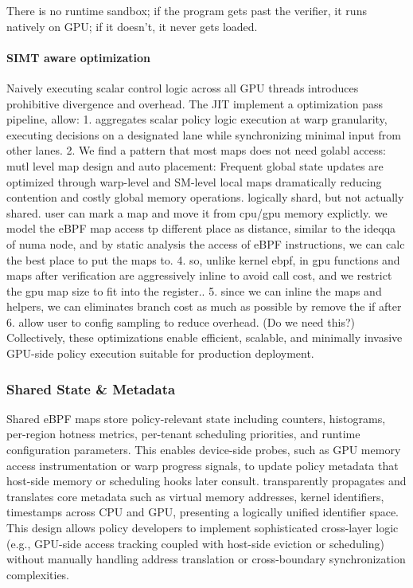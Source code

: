 There is no runtime sandbox; if the program gets past the verifier, it runs natively on GPU; if it doesn't, it never gets loaded.

\paragraph{SIMT aware optimization}

Naively executing scalar control logic across all GPU threads introduces prohibitive divergence and overhead. The \sys JIT implement a optimization pass pipeline, allow:
1. \sys aggregates scalar policy logic execution at warp granularity, executing decisions on a designated lane while synchronizing minimal input from other lanes.
2. We find a pattern that most maps does not need golabl access: mutl level map design and auto placement: Frequent global state updates are optimized through warp-level and SM-level local maps dramatically reducing contention and costly global memory operations. logically shard, but not actually shared. user can mark a map and move it from cpu/gpu memory explictly. we model the eBPF map access tp different place as distance, similar to the ideqqa of numa node, and by static analysis the access of eBPF instructions, we can calc the best place to put the maps to.
4. so, unlike kernel ebpf, in gpu functions and maps after verification are aggressively inline to avoid call cost, and we restrict the gpu map size to fit into the register..
5. since we can inline the maps and helpers, we can eliminates branch cost as much as possible by remove the if after
6. allow user to config sampling to reduce overhead. (Do we need this?)
Collectively, these optimizations enable efficient, scalable, and minimally invasive GPU-side policy execution suitable for production deployment.


\subsubsection{Shared State \& Metadata}

Shared eBPF maps store policy-relevant state including counters, histograms, per-region hotness metrics, per-tenant scheduling priorities, and runtime configuration parameters. This enables device-side probes, such as GPU memory access instrumentation or warp progress signals, to update policy metadata that host-side memory or scheduling hooks later consult. \sys transparently propagates and translates core metadata such as virtual memory addresses, kernel identifiers, timestamps across CPU and GPU, presenting a logically unified identifier space. This design allows policy developers to implement sophisticated cross-layer logic (e.g., GPU-side access tracking coupled with host-side eviction or scheduling) without manually handling address translation or cross-boundary synchronization complexities.